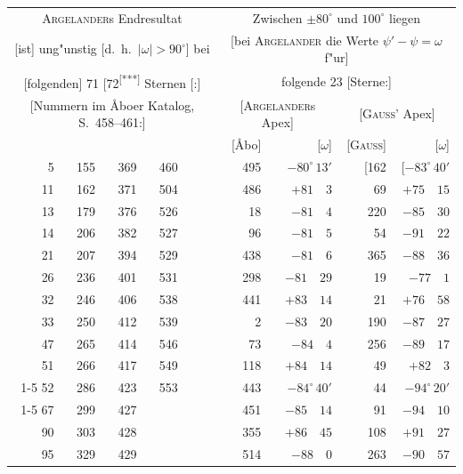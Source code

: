 \documentclass[12pt,a4paper]{article}
\theoremstyle{plain}
\theoremstyle{definition}
\theoremstyle{remark}
\begin{document}
\vspace{1em}
\begin{center}
\begin{tabular}{|rrr|rrr||rr|rr|}
\hline
\multicolumn{6}{|c||}{\textsc{Argelander}s Endresultat} & \multicolumn{4}{c|}{Zwischen $\pm80^{\circ}$ und $100^{\circ}$ liegen}\\
\multicolumn{6}{|c||}{[ist] ung"unstig [d.\ h.\ $|\omega| > 90^{\circ}$] bei} & \multicolumn{4}{c|}{[bei \textsc{Argelander} die Werte $\psi' - \psi = \omega$ f"ur]}\\
\multicolumn{6}{|c||}{[folgenden] 71 [72\textsuperscript{[***]} Sternen [:]} & \multicolumn{4}{c|}{folgende 23 [Sterne:]}\\
\multicolumn{6}{|c||}{[Nummern im \AA{}boer Katalog, S.\ 458--461:]} & \multicolumn{2}{c|}{[\textsc{Argelander}s Apex]} & \multicolumn{2}{c|}{[\textsc{Gauss}' Apex]}\\
\multicolumn{6}{|c||}{} & [\AA{}bo] & [$\omega$] & [\textsc{Gauss}] & [$\omega$]\\
\hline
5 & 155 & 369 & 460 & & & 495 & $-80^{\circ}\,13'$ & [162 & [$-83^{\circ}\,40'$\\
11 & 162 & 371 & 504 & & & 486 & $+81\quad 3$ & 69 & $+75\quad 15$\\
13 & 179 & 376 & 526 & & & 18 & $-81\quad 4$ & 220 & $-85\quad 30$\\
14 & 206 & 382 & 527 & & & 96 & $-81\quad 5$ & 54 & $-91\quad 22$\\
21 & 207 & 394 & 529 & & & 438 & $-81\quad 6$ & 365 & $-88\quad 36$\\
26 & 236 & 401 & 531 & & & 298 & $-81\quad 29$ & 19 & $-77\quad 1$\\
32 & 246 & 406 & 538 & & & 441 & $+83\quad 14$ & 21 & $+76\quad 58$\\
33 & 250 & 412 & 539 & & & 2 & $-83\quad 20$ & 190 & $-87\quad 27$\\
47 & 265 & 414 & 546 & & & 73 & $-84\quad 4$ & 256 & $-89\quad 17$\\
51 & 266 & 417 & 549 & & & 118 & $+84\quad 14$ & 49 & $+82\quad 3$\\
\cline{1-5}
52 & 286 & 423 & 553 & & & 443 & $-84^{\circ}\,40'$ & 44 & $-94^{\circ}\,20'$\\
\cline{1-5}
67 & 299 & 427 & & & & 451 & $-85\quad 14$ & 91 & $-94\quad 10$\\
90 & 303 & 428 & & & & 355 & $+86\quad 45$ & 108 & $+91\quad 27$\\
95 & 329 & 429 & & & & 514 & $-88\quad 0$ & 263 & $-90\quad 57$\\

\end{tabular}
\end{center}
\end{document}
